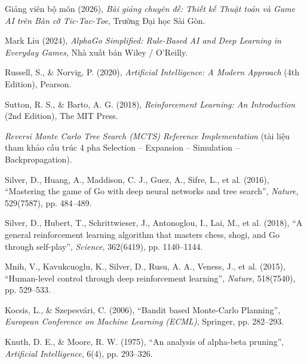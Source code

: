 \documentclass[a4paper,12pt]{report}
\begin{document}
\begin{enumerate}[label={[\arabic*]}, leftmargin=1.2cm]
    \item Giảng viên bộ môn (2026), \textit{Bài giảng chuyên đề: Thiết kế Thuật toán và Game AI trên Bàn cờ Tic-Tac-Toe}, Trường Đại học Sài Gòn.
    \item Mark Liu (2024), \textit{AlphaGo Simplified: Rule-Based AI and Deep Learning in Everyday Games}, Nhà xuất bản Wiley / O'Reilly.
    \item Russell, S., \& Norvig, P. (2020), \textit{Artificial Intelligence: A Modern Approach} (4th Edition), Pearson.
    \item Sutton, R. S., \& Barto, A. G. (2018), \textit{Reinforcement Learning: An Introduction} (2nd Edition), The MIT Press.
    \item \textit{Reversi Monte Carlo Tree Search (MCTS) Reference Implementation} (tài liệu tham khảo cấu trúc 4 pha Selection -- Expansion -- Simulation -- Backpropagation).
    \item Silver, D., Huang, A., Maddison, C. J., Guez, A., Sifre, L., et al. (2016), ``Mastering the game of Go with deep neural networks and tree search'', \textit{Nature}, 529(7587), pp. 484--489.
    \item Silver, D., Hubert, T., Schrittwieser, J., Antonoglou, I., Lai, M., et al. (2018), ``A general reinforcement learning algorithm that masters chess, shogi, and Go through self-play'', \textit{Science}, 362(6419), pp. 1140--1144.
    \item Mnih, V., Kavukcuoglu, K., Silver, D., Rusu, A. A., Veness, J., et al. (2015), ``Human-level control through deep reinforcement learning'', \textit{Nature}, 518(7540), pp. 529--533.
    \item Kocsis, L., \& Szepesvári, C. (2006), ``Bandit based Monte-Carlo Planning'', \textit{European Conference on Machine Learning (ECML)}, Springer, pp. 282--293.
    \item Knuth, D. E., \& Moore, R. W. (1975), ``An analysis of alpha-beta pruning'', \textit{Artificial Intelligence}, 6(4), pp. 293--326.
\end{enumerate}
\end{document}

